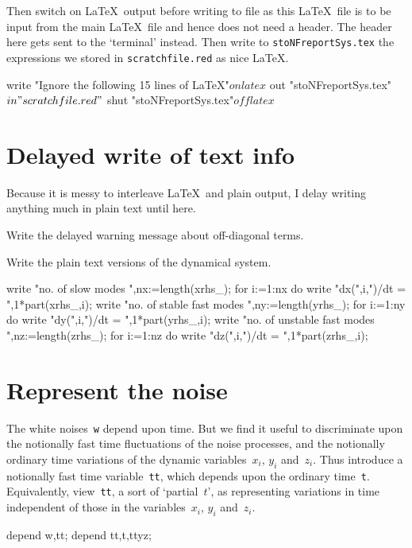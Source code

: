 \documentclass[11pt,a5paper]{article}
\begin{document}
Then switch on \LaTeX\ output before writing to file as this
\LaTeX\ file is to be input from the main \LaTeX\ file and
hence does not need a header. The header here gets sent to
the `terminal' instead. Then write to
\verb|stoNFreportSys.tex| the expressions we stored in
\verb|scratchfile.red| as nice \LaTeX.
\begin{reduce}
write "Ignore the following 15 lines of LaTeX"$
on latex$
out "stoNFreportSys.tex"$
in "scratchfile.red"$
shut "stoNFreportSys.tex"$
off latex$
\end{reduce}



\section{Delayed write of text info}
\label{sec:dwti}

Because it is messy to interleave \LaTeX\ and plain output,
I delay writing anything much in plain text until here.

Write the delayed warning message about off-diagonal terms.

Write the plain text versions of the dynamical system.
\begin{reduce}
write "no. of slow modes ",nx:=length(xrhs_);
for i:=1:nx do write "dx(",i,")/dt = ",1*part(xrhs_,i);
write "no. of stable fast modes ",ny:=length(yrhs_);
for i:=1:ny do write "dy(",i,")/dt = ",1*part(yrhs_,i);
write "no. of unstable fast modes ",nz:=length(zrhs_);
for i:=1:nz do write "dz(",i,")/dt = ",1*part(zrhs_,i);
\end{reduce}



\section{Represent the noise}

The white noises~\verb|w| depend upon time. But we find it
useful to discriminate upon the notionally fast time
fluctuations of the noise processes, and the notionally
ordinary time variations of the dynamic variables~$x_i$,
$y_i$ and~$z_i$. Thus introduce a notionally fast time
variable~\verb|tt|, which depends upon the ordinary
time~\verb|t|. Equivalently, view~\verb|tt|, a sort of
`partial~$t$', as representing variations in time
independent of those in the variables~$x_i$, $y_i$
and~$z_i$.
\begin{reduce}
depend w,tt;
depend tt,t,ttyz;
\end{reduce}
\end{document}
